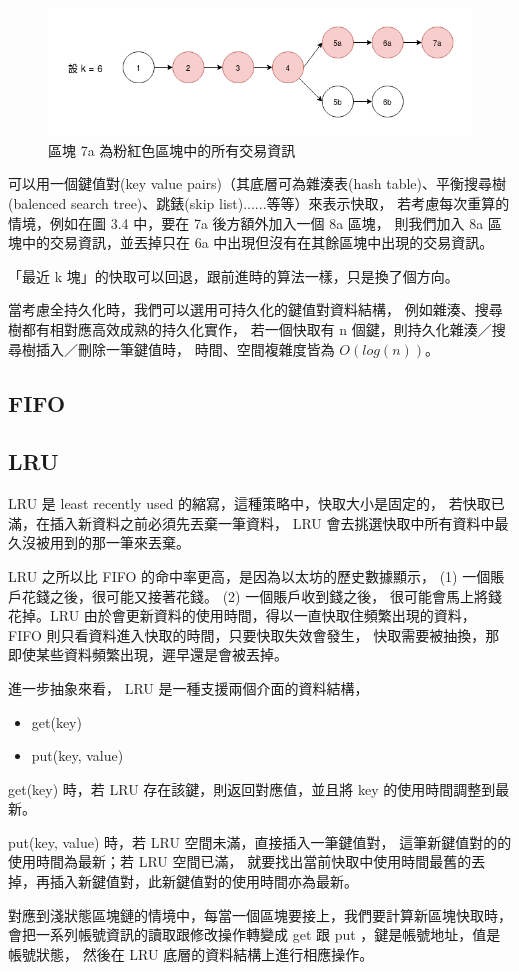 \begin{figure}[h]
\includegraphics[width=\textwidth]{最近k塊}
\caption{區塊 7a 為粉紅色區塊中的所有交易資訊}
\end{figure}

可以用一個鍵值對(key value pairs)（其底層可為雜湊表(hash table)、平衡搜尋樹(balenced search tree)、跳錶(skip list)......等等）來表示快取，
若考慮每次重算的情境，例如在圖 3.4 中，要在 7a 後方額外加入一個 8a 區塊，
則我們加入 8a 區塊中的交易資訊，並丟掉只在 6a 中出現但沒有在其餘區塊中出現的交易資訊。

「最近 k 塊」的快取可以回退，跟前進時的算法一樣，只是換了個方向。

當考慮全持久化時，我們可以選用可持久化的鍵值對資料結構，
例如雜湊\cite{bagwell2001ideal}\cite{puente2017persistence}、搜尋樹都有相對應高效成熟的持久化實作，
若一個快取有 n 個鍵，則持久化雜湊／搜尋樹插入／刪除一筆鍵值時，
時間、空間複雜度皆為 $O(log(n))$。

\subsection{FIFO}

\subsection{LRU}

{\color{red}
LRU 是 least recently used 的縮寫，這種策略中，快取大小是固定的，
若快取已滿，在插入新資料之前必須先丟棄一筆資料，
LRU 會去挑選快取中所有資料中最久沒被用到的那一筆來丟棄。

LRU 之所以比 FIFO 的命中率更高，是因為以太坊的歷史數據顯示，
(1) 一個賬戶花錢之後，很可能又接著花錢。 (2) 一個賬戶收到錢之後，
很可能會馬上將錢花掉。LRU 由於會更新資料的使用時間，得以一直快取住頻繁出現的資料，
FIFO 則只看資料進入快取的時間，只要快取失效會發生，
快取需要被抽換，那即使某些資料頻繁出現，遲早還是會被丟掉。

進一步抽象來看， LRU 是一種支援兩個介面的資料結構，

\begin{itemize}
  \item get(key)
  \item put(key, value)
\end{itemize}

get(key) 時，若 LRU 存在該鍵，則返回對應值，並且將 key 的使用時間調整到最新。

put(key, value) 時，若 LRU 空間未滿，直接插入一筆鍵值對，
這筆新鍵值對的的使用時間為最新；若 LRU 空間已滿，
就要找出當前快取中使用時間最舊的丟掉，再插入新鍵值對，此新鍵值對的使用時間亦為最新。

對應到淺狀態區塊鏈的情境中，每當一個區塊要接上，我們要計算新區塊快取時，
會把一系列帳號資訊的讀取跟修改操作轉變成 get 跟 put ，鍵是帳號地址，值是帳號狀態，
然後在 LRU 底層的資料結構上進行相應操作。
}


